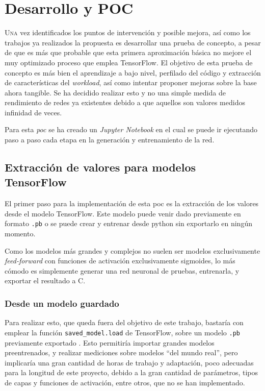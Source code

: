 \chapter{Desarrollo y POC}
\label{chap:desarrollo_poc}

\lettrine{U}{na} vez identificados los puntos de intervención y posible mejora, así como los trabajos ya realizados la propuesta es desarrollar una prueba de concepto, a pesar de que es más que probable que esta primera aproximación básica no mejore el muy optimizado proceso que emplea TensorFlow. El objetivo de esta prueba de concepto es más bien el aprendizaje a bajo nivel, perfilado del código y extracción de características del \textit{workload}, así como intentar proponer mejoras sobre la base ahora tangible. Se ha decidido realizar esto y no una simple medida de rendimiento de redes ya existentes debido a que aquellos son valores medidos infinidad de veces.

Para esta \textit{\acrlong{poc}} se ha creado un \textit{Jupyter Notebook} en el cual se puede ir ejecutando paso a paso cada etapa en la generación y entrenamiento de la red. 

\section{Extracción de valores para modelos TensorFlow}
\label{sec:extraccion_valores_modelo_tf}
El primer paso para la implementación de esta \acrshort{poc} es la extracción de los valores desde el modelo TensorFlow. Este modelo puede venir dado previamente en formato \texttt{.pb} o se puede crear y entrenar desde python sin exportarlo en ningún momento.

Como los modelos más grandes y complejos no suelen ser modelos exclusivamente \textit{feed-forward} con funciones de activación exclusivamente sigmoides, lo más cómodo es simplemente generar una red neuronal de pruebas, entrenarla, y exportar el resultado a C.

\subsection{Desde un modelo guardado}
\label{ssec:desde_modelo_guardado}
Para realizar esto, que queda fuera del objetivo de este trabajo, bastaría con emplear la función \texttt{saved\_model.load} de TensorFlow, sobre un modelo \texttt{.pb} previamente exportado \cite{tensorflow_saved_model}. Esto permitiría importar grandes modelos preentrenados, y realizar mediciones sobre modelos ``del mundo real'', pero implicaría una gran cantidad de horas de trabajo y adaptación, poco adecuadas para la longitud de este proyecto, debido a la gran cantidad de parámetros, tipos de capas y funciones de activación, entre otros, que no se han implementado.

